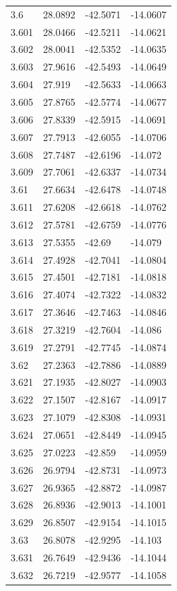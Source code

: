 \begin{tabular}{llll}
3.6 & 28.0892 & -42.5071 & -14.0607 \\
3.601 & 28.0466 & -42.5211 & -14.0621 \\
3.602 & 28.0041 & -42.5352 & -14.0635 \\
3.603 & 27.9616 & -42.5493 & -14.0649 \\
3.604 & 27.919 & -42.5633 & -14.0663 \\
3.605 & 27.8765 & -42.5774 & -14.0677 \\
3.606 & 27.8339 & -42.5915 & -14.0691 \\
3.607 & 27.7913 & -42.6055 & -14.0706 \\
3.608 & 27.7487 & -42.6196 & -14.072 \\
3.609 & 27.7061 & -42.6337 & -14.0734 \\
3.61 & 27.6634 & -42.6478 & -14.0748 \\
3.611 & 27.6208 & -42.6618 & -14.0762 \\
3.612 & 27.5781 & -42.6759 & -14.0776 \\
3.613 & 27.5355 & -42.69 & -14.079 \\
3.614 & 27.4928 & -42.7041 & -14.0804 \\
3.615 & 27.4501 & -42.7181 & -14.0818 \\
3.616 & 27.4074 & -42.7322 & -14.0832 \\
3.617 & 27.3646 & -42.7463 & -14.0846 \\
3.618 & 27.3219 & -42.7604 & -14.086 \\
3.619 & 27.2791 & -42.7745 & -14.0874 \\
3.62 & 27.2363 & -42.7886 & -14.0889 \\
3.621 & 27.1935 & -42.8027 & -14.0903 \\
3.622 & 27.1507 & -42.8167 & -14.0917 \\
3.623 & 27.1079 & -42.8308 & -14.0931 \\
3.624 & 27.0651 & -42.8449 & -14.0945 \\
3.625 & 27.0223 & -42.859 & -14.0959 \\
3.626 & 26.9794 & -42.8731 & -14.0973 \\
3.627 & 26.9365 & -42.8872 & -14.0987 \\
3.628 & 26.8936 & -42.9013 & -14.1001 \\
3.629 & 26.8507 & -42.9154 & -14.1015 \\
3.63 & 26.8078 & -42.9295 & -14.103 \\
3.631 & 26.7649 & -42.9436 & -14.1044 \\
3.632 & 26.7219 & -42.9577 & -14.1058 \\

\end{tabular}
